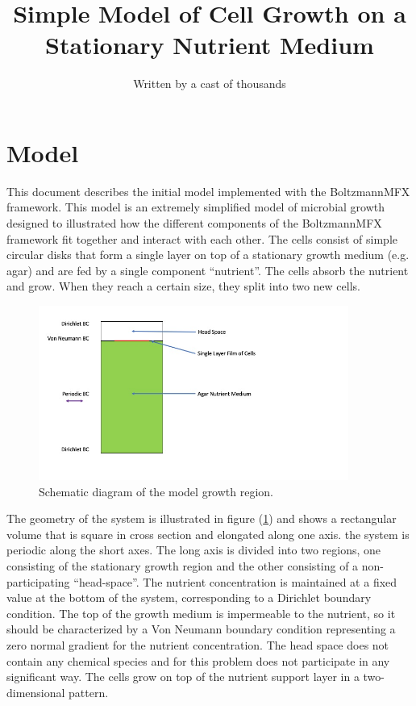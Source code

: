 \documentclass[12pt]{article}
\begin{document}
\newcommand{\dt}{\Delta t}
\title{Simple Model of Cell Growth on a Stationary Nutrient Medium}
\author{Written by a cast of thousands}
\maketitle

\renewcommand{\thetable}{\Roman{table}}

\section{Model}
This document describes the initial model implemented with the BoltzmannMFX
framework. This model is an extremely simplified model of microbial growth
designed to illustrated how the different components of the BoltzmannMFX
framework fit together and interact with each other. The cells consist of simple
circular disks that form a single layer on top of a stationary growth medium
(e.g. agar) and are fed by a single component ``nutrient''. The cells absorb the
nutrient and grow. When they reach a certain size, they split into two new
cells.

\begin{figure}
\centering
\includegraphics[width=4.0in,keepaspectratio=true]{FullSys}
\caption{\label{fullsys} Schematic diagram of the model growth region.}
\end{figure}
The geometry of the system is illustrated in figure (\ref{fullsys}) and shows a
rectangular volume that is square in cross section and elongated along one axis.
the system is periodic along the short axes. The long axis is divided into two
regions, one consisting of the stationary growth region and the other consisting
of a non-participating ``head-space''. The nutrient concentration is maintained
at a fixed value at the bottom of the system, corresponding to a Dirichlet
boundary condition. The top of the growth medium is impermeable to the nutrient,
so it should be characterized by a Von Neumann boundary condition representing
a zero normal gradient for the nutrient concentration. The head space does not
contain any chemical species and for this problem does not participate in any
significant way. The cells grow on top of the nutrient support layer in a
two-dimensional pattern.
\end{document}
